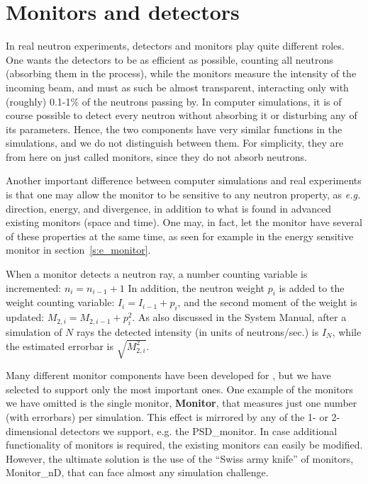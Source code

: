 
\chapter{Monitors and detectors}

In real neutron experiments, detectors and monitors play quite
different roles. One wants the detectors to be as efficient as 
possible, counting all neutrons (absorbing them in the process), 
while the monitors measure the intensity of the incoming beam, and must
as such be almost transparent, interacting only with (roughly) 0.1-1\%
of the neutrons passing by. In computer simulations, it is 
of course possible to detect every neutron without 
absorbing it or disturbing any of its parameters. Hence, the two components
have very similar functions in the simulations, and we do
not distinguish between them. For simplicity, they are from here on
just called monitors, since they do not absorb neutrons.

Another important difference between computer simulations 
and real experiments is
that one may allow the monitor to be sensitive to any neutron property,
as {\em e.g.} direction, energy, and divergence, in addition to what
is found in advanced existing monitors (space and time). One may, in
fact, let the monitor have several of these properties at the same time,
as seen for example in the energy sensitive monitor in
section~\ref{s:e_monitor}.

When a monitor detects a neutron ray, 
a number counting variable is incremented: $n_i = n_{i-1}+1$
In addition, the neutron
weight $p_i$ is added to the weight counting variable:
$I_i = I_{i-1} + p_i$, 
and the second moment of the weight is
updated: $M_{2,i} = M_{2,i-1} + p_i^2$. 
As also discussed in the System Manual, after a simulation of $N$ rays
the detected intensity (in units of neutrons/sec.) is $I_N$,
while the estimated errorbar is $\sqrt{M_{2,i}^2}$.


Many different monitor components have been developed for
\MCS , but we have selected to support only the most important ones.
One example of the monitors we have omitted is the single monitor,
{\bf Monitor},
that measures just one number (with errorbars) per simulation.
This effect is mirrored by any of the 1- or 2-dimensional detectors
we support, e.g. the {\rm PSD\_monitor}. 
In case additional functionality of monitors is required,
the existing monitors can easily be modified.
However, the ultimate solution is the use of the 
``Swiss army knife'' of monitors, {\rm Monitor\_nD}, that can face
almost any simulation challenge. 

\newpage


\newpage


\newpage


\newpage


\newpage


\newpage


%
